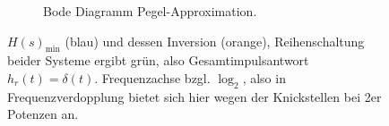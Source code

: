 \begin{figure}[h]
\begin{subfigure}{\textwidth}
\caption{Bode Diagramm Pegel-Approximation.}
\label{fig:bode_tikz_4926427BA9}
\end{subfigure}
\caption{$H(s)_\mathrm{min}$ (blau) und dessen Inversion (orange),
Reihenschaltung beider Systeme ergibt grün, also Gesamtimpulsantwort $h_r(t)=\delta(t)$.
Frequenzachse bzgl. $\log_2$, also in Frequenzverdopplung bietet sich
hier wegen der Knickstellen bei 2er Potenzen an.}
\label{fig:inversion_4926427BA9_plus_tikz}
\end{figure}
\clearpage







\newpage
